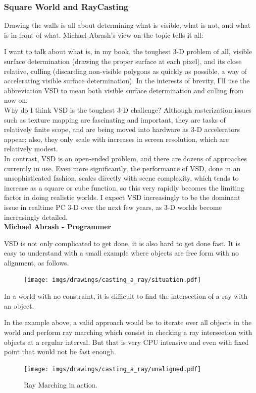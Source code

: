 \subsubsection{Square World and RayCasting}
Drawing the walls is all about determining what is visible, what is not, and what is in front of what. Michael Abrash's view on the topic tells it all:\\
\par
\begin{fancyquotes}
I want to talk about what is, in my book, the toughest 3-D problem of all, visible surface determination (drawing the proper surface at each pixel), and its close relative, culling (discarding non-visible polygons as quickly as possible, a way of accelerating visible surface determination). In the interests of brevity, I'll use the abbreviation VSD to mean both visible surface determination and culling from now on.
 \bigskip \\
Why do I think VSD is the toughest 3-D challenge? Although rasterization issues such as texture mapping are fascinating and important, they are tasks of relatively finite scope, and are being moved into hardware as 3-D accelerators appear; also, they only scale with increases in screen resolution, which are relatively modest.
 \bigskip \\
In contrast, VSD is an open-ended problem, and there are dozens of approaches currently in use. Even more significantly, the performance of VSD, done in an unsophisticated fashion, scales directly with scene complexity, which tends to increase as a square or cube function, so this very rapidly becomes the limiting factor in doing realistic worlds. I expect VSD increasingly to be the dominant issue in realtime PC 3-D over the next few years, as 3-D worlds become increasingly detailed.
 \bigskip \\
\textbf{Michael Abrash - Programmer}
 \end{fancyquotes}
 \par
VSD is not only complicated to get done, it is also hard to get done fast. It is easy to understand with a small example where objects are free form with no alignment, as follows.

\par
\begin{figure}[H]
\centering
\texttt{[image: imgs/drawings/casting\_a\_ray/situation.pdf]}
 
\end{figure}

In a world with no constraint, it is difficult to find the intersection of a ray with an object.\\
\par
In the example above, a valid approach would be to iterate over all objects in the world and perform ray marching which consist in checking a ray intersection with objects at a regular interval. But that is very CPU intensive and even with fixed point that would not be fast enough.
\begin{figure}[H]
\centering
\texttt{[image: imgs/drawings/casting\_a\_ray/unaligned.pdf]}
 \caption{Ray Marching in action.}
\end{figure}



